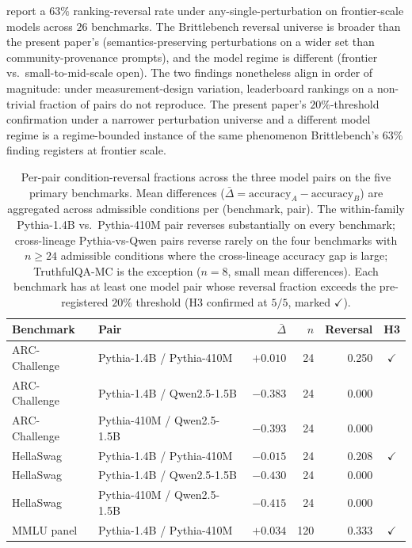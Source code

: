 \documentclass[11pt]{article}
\begin{document}
\citet{romanou2026brittlebench} report a $63\%$ ranking-reversal rate under any-single-perturbation on frontier-scale models across $26$ benchmarks. The Brittlebench reversal universe is broader than the present paper's (semantics-preserving perturbations on a wider set than community-provenance prompts), and the model regime is different (frontier vs.\ small-to-mid-scale open). The two findings nonetheless align in order of magnitude: under measurement-design variation, leaderboard rankings on a non-trivial fraction of pairs do not reproduce. The present paper's $20\%$-threshold confirmation under a narrower perturbation universe and a different model regime is a regime-bounded instance of the same phenomenon Brittlebench's $63\%$ finding registers at frontier scale.

\begin{table}[h]
\centering
\small
\caption{Per-pair condition-reversal fractions across the three model pairs on the five primary benchmarks. Mean differences ($\bar{\Delta} = \mathrm{accuracy}_A - \mathrm{accuracy}_B$) are aggregated across admissible conditions per (benchmark, pair). The within-family Pythia-1.4B vs.\ Pythia-410M pair reverses substantially on every benchmark; cross-lineage Pythia-vs-Qwen pairs reverse rarely on the four benchmarks with $n \geq 24$ admissible conditions where the cross-lineage accuracy gap is large; TruthfulQA-MC is the exception ($n = 8$, small mean differences). Each benchmark has at least one model pair whose reversal fraction exceeds the pre-registered $20\%$ threshold (H3 confirmed at $5/5$, marked $\checkmark$).}
\label{tab:ranking-reversals}
\begin{tabular}{llrrrc}
\toprule
Benchmark & Pair & $\bar{\Delta}$ & $n$ & Reversal & H3 \\
\midrule
ARC-Challenge & Pythia-1.4B / Pythia-410M  & $+0.010$ & 24  & 0.250 & $\checkmark$ \\
ARC-Challenge & Pythia-1.4B / Qwen2.5-1.5B & $-0.383$ & 24  & 0.000 & \\
ARC-Challenge & Pythia-410M / Qwen2.5-1.5B & $-0.393$ & 24  & 0.000 & \\
HellaSwag     & Pythia-1.4B / Pythia-410M  & $-0.015$ & 24  & 0.208 & $\checkmark$ \\
HellaSwag     & Pythia-1.4B / Qwen2.5-1.5B & $-0.430$ & 24  & 0.000 & \\
HellaSwag     & Pythia-410M / Qwen2.5-1.5B & $-0.415$ & 24  & 0.000 & \\
MMLU panel    & Pythia-1.4B / Pythia-410M  & $+0.034$ & 120 & 0.333 & $\checkmark$ \\

\end{tabular}
\end{table}
\end{document}
